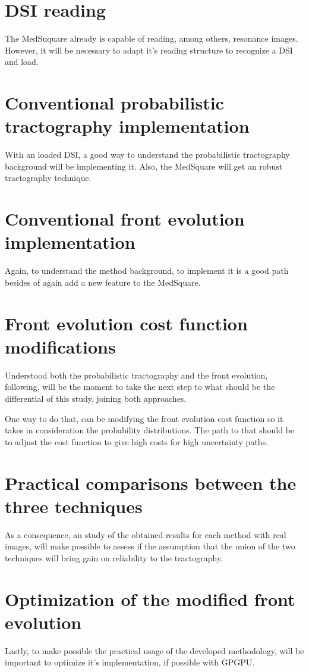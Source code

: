 \documentclass[a4paper,11pt]{report}
\begin{document}
  \section{DSI reading}
  The MedSuquare already is capable of reading, among others, resonance images. However, it will be necessary to adapt it's reading structure to recognize a DSI and load.

  \section{Conventional probabilistic tractography implementation}
  With an loaded DSI, a good way to understand the probabilistic tractography background will be implementing it. Also, the MedSquare will get an robust tractography technique.

  \section{Conventional front evolution implementation}
  Again, to understand the method background, to implement it is a good path besides of again add a new feature to the MedSquare.

  \section{Front evolution cost function modifications}
  Understood both the probabilistic tractography and the front evolution, following, will be the moment to take the next step to what should be the differential of this study, joining both approaches.

  One way to do that, can be modifying the front evolution cost function so it takes in consideration the probability distributions. The path to that should be to adjust the cost function to give high costs for high uncertainty paths.

  \section{Practical comparisons between the three techniques}
  As a consequence, an study of the obtained results for each method with real images, will make possible to assess if the assumption that the union of the two techniques will bring gain on reliability to the tractography.

  \section{Optimization of the modified front evolution}
  Lastly, to make possible the practical usage of the developed methodology, will be important to optimize it's implementation, if possible with GPGPU.
\end{document}
